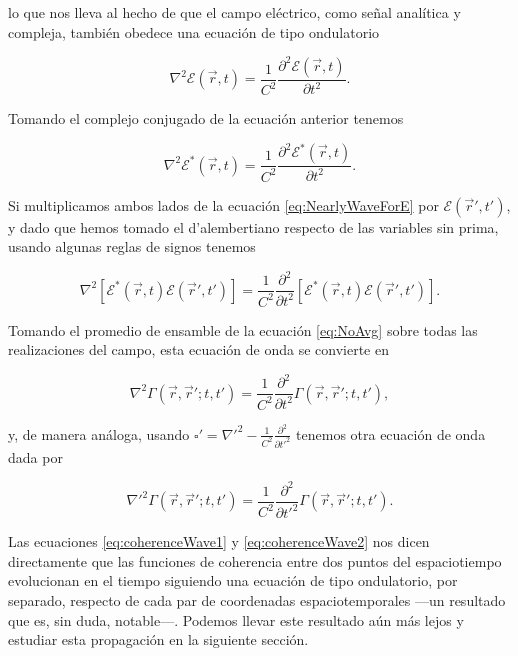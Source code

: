 		lo que nos lleva al hecho de que el campo eléctrico, como señal analítica y compleja, también obedece una ecuación de tipo ondulatorio

		\begin{equation}
			\nabla^2 \mathcal{E}(\vec{r},t) = \frac{1}{C^2}\frac{\partial^2 \mathcal{E}(\vec{r},t)}{\partial t^2}.
		\end{equation}

		Tomando el complejo conjugado de la ecuación anterior tenemos

		\begin{equation}\label{eq:NearlyWaveForE}
			\nabla^2 \mathcal{E}^*(\vec{r},t) = \frac{1}{C^2}\frac{\partial^2 \mathcal{E}^*(\vec{r},t)}{\partial t^2}.
		\end{equation}

		Si multiplicamos ambos lados de la ecuación \eqref{eq:NearlyWaveForE} por $\mathcal{E}(\vec{r}',t')$, y dado que hemos tomado el d'alembertiano respecto de las variables sin prima, usando algunas reglas de signos tenemos

		\begin{equation}\label{eq:NoAvg}
			\nabla^2 \left[ \mathcal{E}^*(\vec{r},t)\mathcal{E}(\vec{r}',t') \right] =  \frac{1}{C^2} \frac{\partial^2}{\partial t^2}\left[ \mathcal{E}^*(\vec{r},t)\mathcal{E}(\vec{r}',t') \right].
		\end{equation}

		Tomando el promedio de ensamble de la ecuación \eqref{eq:NoAvg} sobre todas las realizaciones del campo, esta ecuación de onda se convierte en

		\begin{equation}\label{eq:coherenceWave1}
			\nabla^2 \Gamma(\vec{r},\vec{r}';t,t') = \frac{1}{C^2}\frac{\partial^2}{\partial t^2} \Gamma(\vec{r},\vec{r}';t,t'),
		\end{equation}

		y, de manera análoga, usando $\square' = \nabla'^2 - \frac{1}{C^2}\frac{\partial^2}{\partial t'^2}$ tenemos otra ecuación de onda dada por

		\begin{equation}\label{eq:coherenceWave2}
			\nabla'^2 \Gamma(\vec{r},\vec{r}';t,t') = \frac{1}{C^2}\frac{\partial^2}{\partial t'^2} \Gamma(\vec{r},\vec{r}';t,t').
		\end{equation}

		Las ecuaciones \eqref{eq:coherenceWave1} y \eqref{eq:coherenceWave2} nos dicen directamente que las funciones de coherencia entre dos puntos del espaciotiempo evolucionan en el tiempo siguiendo una ecuación de tipo ondulatorio, por separado, respecto de cada par de coordenadas espaciotemporales —un resultado que es, sin duda, notable—. Podemos llevar este resultado aún más lejos y estudiar esta propagación en la siguiente sección.


